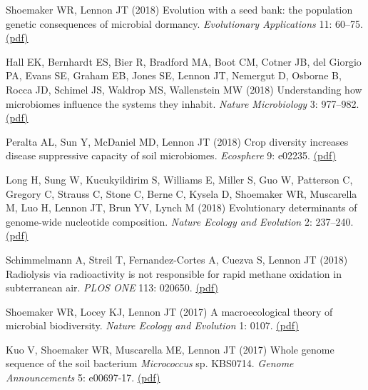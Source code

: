 \documentclass[11pt]{article}
\begin{document}
\begin{etaremune}
\item Shoemaker WR, Lennon JT (2018) Evolution with a seed bank: the population genetic consequences of microbial dormancy. \textit{Evolutionary Applications} 11: 60–75. \href{https://lennonlab.github.io/assets/publications/Shoemaker_Lennon_2018.pdf}{(pdf)}

\item Hall EK, Bernhardt ES, Bier R, Bradford MA, Boot CM, Cotner JB, del Giorgio PA, Evans SE, Graham EB, Jones SE, Lennon JT, Nemergut D, Osborne B, Rocca JD, Schimel JS, Waldrop MS, Wallenstein MW (2018) Understanding how microbiomes influence the systems they inhabit. \textit{Nature Microbiology} 3: 977–982. \href{https://lennonlab.github.io/assets/publications/Hall_etal_2018.pdf}{(pdf)}

\item Peralta AL, Sun Y, McDaniel MD, Lennon JT (2018) Crop diversity increases disease suppressive capacity of soil microbiomes. \textit{Ecosphere} 9: e02235. \href{https://lennonlab.github.io/assets/publications/Peralta_etal_2018.pdf}{(pdf)}

\item Long H, Sung W, Kucukyildirim S, Williams E, Miller S, Guo W, Patterson C, Gregory C, Strauss C, Stone C, Berne C, Kysela D, Shoemaker WR, Muscarella M, Luo H, Lennon JT, Brun YV, Lynch M (2018) Evolutionary determinants of genome-wide nucleotide composition. \textit{Nature Ecology and Evolution} 2: 237--240. \href{https://lennonlab.github.io/assets/publications/Long_etal_2018.pdf}{(pdf)}

\item Schimmelmann A, Streil T, Fernandez-Cortes A, Cuezva S, Lennon JT (2018) Radiolysis via radioactivity is not responsible for rapid methane oxidation in subterranean air. \textit{PLOS ONE} 113: 020650. \href{https://lennonlab.github.io/assets/publications/Schimmelmann_etal_2018.pdf}{(pdf)}

\item Shoemaker WR, Locey KJ, Lennon JT (2017) A macroecological theory of microbial biodiversity. \textit{Nature Ecology and Evolution} 1: 0107. \href{https://lennonlab.github.io/assets/publications/Shoemaker_etal_2017.pdf}{(pdf)}

\item Kuo V, Shoemaker WR, Muscarella ME, Lennon JT (2017) Whole genome sequence of the soil bacterium \textit{Micrococcus} sp. KBS0714. \textit{Genome Announcements} 5: e00697-17. \href{https://lennonlab.github.io/assets/publications/Kuo_etal_2017.pdf}{(pdf)}


\end{etaremune}
\end{document}
